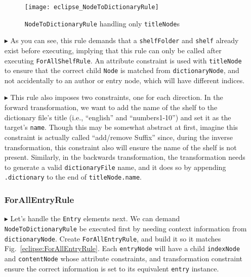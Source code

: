 \begin{itemize}
\vspace{0.5cm}

\begin{figure}[htbp]
\begin{center}
  \texttt{[image: eclipse\_NodeToDictionaryRule]}
  \caption{\texttt{NodeToDictionaryRule} handling only \texttt{titleNode}s}
  \label{eclipse:NodeToDictionaryRule}
\end{center}
\end{figure}

\newpage

\item[$\blacktriangleright$] As you can see, this rule demands that a \texttt{shelfFolder} and \texttt{shelf} already exist before executing, implying that this
rule can only be called after executing \texttt{ForAllShelfRule}. An attribute constraint is used with \texttt{titleNode} to ensure that the correct child
\texttt{Node} is matched from \texttt{dictionaryNode}, and not accidentally to an author or entry node, which will have different indices.

\item[$\blacktriangleright$] This rule also imposes two constraints, one for each direction. In the forward transformation, we want to add the name of
the shelf to the dictionary file's title (i.e., ``english'' and ``numbers1-10'') and set it as the target's \texttt{name}. Though this may be somewhat abstract
at first, imagine this constraint is actually called ``add/remove Suffix'' since, during the inverse transformation, this constraint also will ensure the name
of the shelf is not present. Similarly, in the backwards transformation, the transformation needs to generate a valid \texttt{dictionaryFile} name, and it does
so by appending \texttt{.dictionary} to the end of \texttt{titleNode.name}.

\subsubsection{ForAllEntryRule} %

\item[$\blacktriangleright$] Let's handle the \texttt{Entry} elements next. We can demand \texttt{Node\-To\-Dict\-ion\-ary\-Rule} be executed first by needing
context information from \texttt{dictionaryNode}. Create \texttt{ForAllEntryRule}, and build it so it matches
Fig.~\ref{eclipse:ForAllEntryRule}. Each \texttt{entryNode} will have a child \texttt{indexNode} and \texttt{contentNode} whose attribute constraints, and
transformation constraint ensure the correct information is set to its equivalent \texttt{entry} instance.


\end{itemize}
